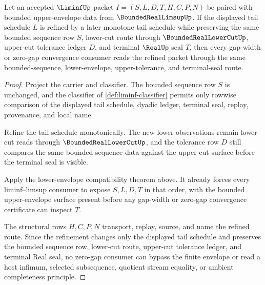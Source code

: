 \begin{theorem}
\label{thm:liminf-tail-envelope-monotone-refinement}
Let an accepted $\LiminfUp$ packet $I=(S,L,D,T,H,C,P,N)$ be paired with bounded upper-envelope data from $\BoundedRealLimsupUp$. If the displayed tail schedule $L$ is refined by a later monotone tail schedule while preserving the same bounded sequence row $S$, lower-cut route through $\BoundedRealLowerCutUp$, upper-cut tolerance ledger $D$, and terminal $\RealUp$ seal $T$, then every gap-width or zero-gap convergence consumer reads the refined packet through the same bounded-sequence, lower-envelope, upper-tolerance, and terminal-seal route.
\end{theorem}
\begin{proof}
Project the carrier and classifier. The bounded sequence row $S$ is unchanged, and the classifier of \autoref{def:liminf-classifier} permits only rowwise comparison of the displayed tail schedule, dyadic ledger, terminal seal, replay, provenance, and local name.

Refine the tail schedule monotonically. The new lower observations remain lower-cut reads through $\BoundedRealLowerCutUp$, and the tolerance row $D$ still compares the same bounded-sequence data against the upper-cut surface before the terminal seal is visible.

Apply the lower-envelope compatibility theorem above. It already forces every liminf--limsup consumer to expose $S,L,D,T$ in that order, with the bounded upper-envelope surface present before any gap-width or zero-gap convergence certificate can inspect $T$.

The structural rows $H,C,P,N$ transport, replay, source, and name the refined route. Since the refinement changes only the displayed tail schedule and preserves the bounded sequence row, lower-cut route, upper-cut tolerance ledger, and terminal Real seal, no zero-gap consumer can bypass the finite envelope or read a host infimum, selected subsequence, quotient stream equality, or ambient completeness principle.
\end{proof}

